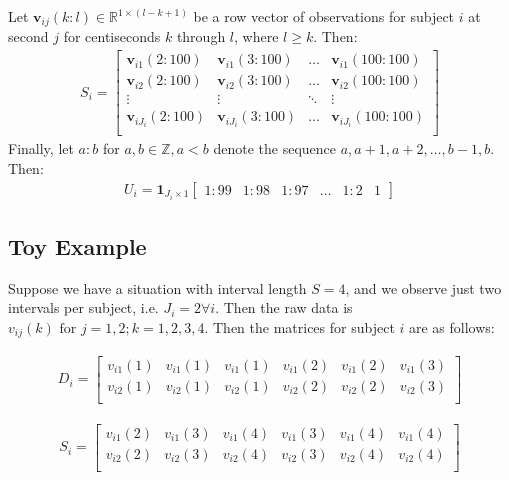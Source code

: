 \noindent Let $\mathbf{v}_{ij}(k:l) \in \mathbb{R}^{1\times (l-k+1)}$ be a row vector of observations for subject $i$ at second $j$ for centiseconds $k$ through $l$, where $l \geq k$. Then: 
\begin{align*}
    \mathit{S}_i = \begin{bmatrix}
        \mathbf{v}_{i1}(2:100) & \mathbf{v}_{i1}(3:100) & \dots & \mathbf{v}_{i1}(100:100)\\ 
         \mathbf{v}_{i2}(2:100) & \mathbf{v}_{i2}(3:100) & \dots & \mathbf{v}_{i2}(100:100)\\ 
        \vdots & \vdots & \ddots & \vdots \\ 
       \mathbf{v}_{iJ_i}(2:100) & \mathbf{v}_{iJ_i}(3:100) & \dots & \mathbf{v}_{iJ_i}(100:100)\\ 
    \end{bmatrix}
\end{align*}
Finally, let $a:b$ for $a,b\in \mathbb{Z}, a < b$ denote the sequence  $a,a+1, a+2, \dots,  b-1, b $. Then: 
\begin{align*}
   \mathit{U}_i  = \mathbf{1}_{J_i\times 1}
   \begin{bmatrix}
       1:99 & 1:98 & 1:97 & \dots & 1:2 & 1 
   \end{bmatrix}
   \end{align*}

\subsection{Toy Example}

Suppose we have a situation with interval length $S = 4$, and we observe just two intervals per subject, i.e. $J_i = 2 \forall i$.  Then the raw data is $v_{ij}(k) \text{ for } j = 1,2; k = 1, 2, 3, 4$. Then the matrices for subject $i$ are as follows: 

\begin{align*}
    \mathit{D}_i = 
   \begin{bmatrix}
   v_{i 1}(1)  & v_{i1}(1)& v_{i 1}(1)  & v_{i 1}(2) & v_{i 1}(2) & v_{i 1}(3) \\
      v_{i 2}(1)  & v_{i 2}(1)& v_{i 2}(1)  & v_{i 2}(2) & v_{i 2}(2) & v_{i 2}(3) \\
    \end{bmatrix}
\end{align*}


\begin{align*}
    \mathit{S}_i = 
   \begin{bmatrix}
   v_{i 1}(2)  & v_{i 1}(3)& v_{i 1}(4)  & v_{i 1}(3) & v_{i 1}(4) & v_{i 1}(4) \\
      v_{i 2}(2)  & v_{i 2}(3)& v_{i 2}(4)  & v_{i 2}(3) & v_{i 2}(4) & v_{i 2}(4) \\
    \end{bmatrix}
\end{align*}

